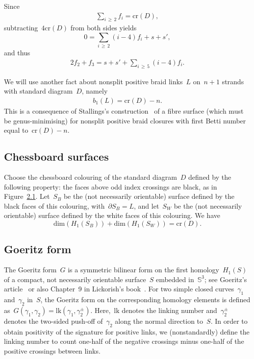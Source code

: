 \documentclass[10pt,a4paper]{amsart}
\numberwithin{equation}{section}
\newcommand{\rcr}{\mathrm{cr}}
\newcommand{\rdim}{\mathrm{dim}}
\newcommand{\bbS}{\mathbb{S}}
\newcommand{\rlk}{\mathrm{lk}}
\begin{document}
Since
\begin{align*}
\sum_{i\,\ge\,2} f_i = \rcr (D),
\end{align*}
subtracting~$4\rcr (D)$ from both sides yields
\[
0 = \sum_{i\,\ge\,2} (i-4)f_i + s+s',
\]
and thus
\begin{align}\label{constraint}
2f_2 + f_3 = s+ s' + \sum_{i\,\ge\,5}(i-4)f_i.
\end{align}

We will use another fact about nonsplit positive braid links~$L$ on~$n+1$ strands with standard diagram~$D$, namely
\begin{align}\label{Betti}
b_1(L) = \rcr (D)-n.
\end{align}
This is a consequence of Stallings's construction~\cite{Stallings} of a fibre surface (which must be genus-minimising) for nonsplit positive braid closures with first Betti number equal to~$\rcr (D)-n$.

\subsection{Chessboard surfaces}

Choose the chessboard colouring of the standard diagram~$D$ defined by the following property: the faces above odd index crossings are black, as in Figure~\href{https://ahl.centre-mersenne.org/item/AHL_2024__7__823_0/}{2.1}. Let~$S_B$ be the (not necessarily orientable) surface defined by the black faces of this colouring, with~$\partial S_B = L$, and let~$S_W$ be the (not necessarily orientable) surface defined by the white faces of this colouring. We have
\begin{equation}\label{e: homology sum}
\rdim (H_1(S_B)) + \rdim (H_1(S_W)) = \rcr (D).
\end{equation}

\subsection{Goeritz form}

The Goeritz form~$G$ is a symmetric bilinear form on the first homology~$H_1(S)$ of a compact, not necessarily orientable surface~$S$ embedded in~$\bbS^3$; see Goeritz's article~\cite{Goeritz} or also Chapter~9 in Lickorish's book~\cite{Lickorish}. For two simple closed curves~$\gamma_1$ and~$\gamma_2$ in~$S$, the Goeritz form on the corresponding homology elements is defined as~$G(\gamma_1, \gamma_2) = \rlk (\gamma_1,\gamma_2^\pm)$. Here,~$\rlk $ denotes the linking number and~$\gamma_2^\pm$ denotes the two-sided push-off of~$\gamma_2$ along the normal direction to~$S$. In order to obtain positivity of the signature for positive links, we (nonstandardly) define the linking number to count one-half of the negative crossings minus one-half of the positive crossings between links.
\end{document}
